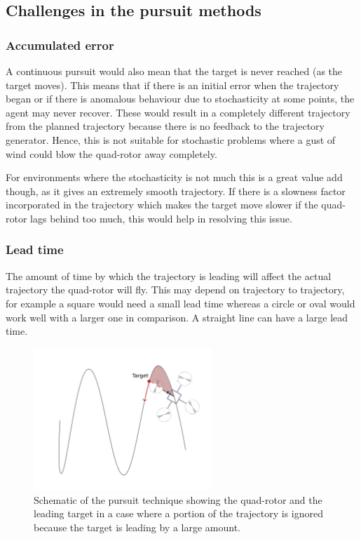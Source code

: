 \documentclass[hidelinks,BTech]{iitmdiss}
\begin{document}
\subsection*{Challenges in the pursuit methods}

\subsubsection{Accumulated error}
A continuous pursuit would also mean that the target is never reached (as the target moves). This means that if there is an initial error when the trajectory began or if there is anomalous behaviour due to stochasticity at some points, the agent may never recover. These would result in a completely different trajectory from the planned trajectory because there is no feedback to the trajectory generator. Hence, this is not suitable for stochastic problems where a gust of wind could blow the quad-rotor away completely.

For environments where the stochasticity is not much this is a great value add though, as it gives an extremely smooth trajectory. If there is a slowness factor incorporated in the trajectory which makes the target move slower if the quad-rotor lags behind too much, this would help in resolving this issue.

\subsubsection{Lead time}
The amount of time by which the trajectory is leading will affect the actual trajectory the quad-rotor will fly. This may depend on trajectory to trajectory, for example a square would need a small lead time whereas a circle or oval would work well with a larger one in comparison. A straight line can have a large lead time.

\begin{figure}[H]
  \centering
    \includegraphics[width=0.6\textwidth]{pursuit_con.png}
    \caption{Schematic of the pursuit technique showing the quad-rotor and the leading target in a case where a portion of the trajectory is ignored because the target is leading by a large amount.}
\end{figure}
\end{document}
